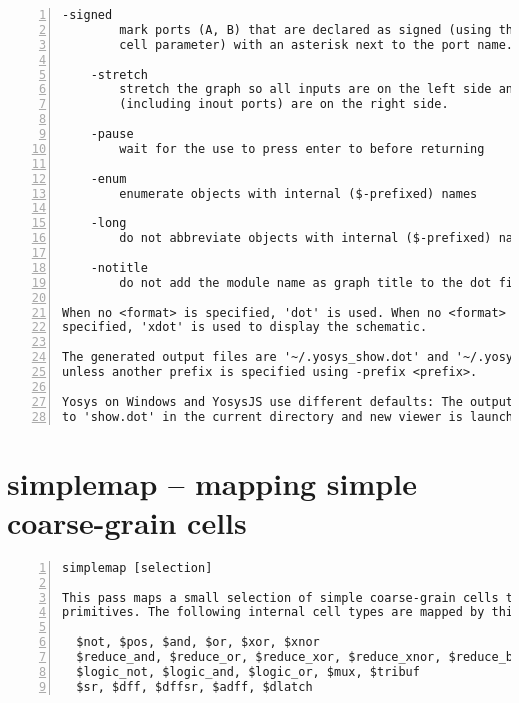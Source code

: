 \begin{lstlisting}[numbers=left,frame=single]
    -signed
        mark ports (A, B) that are declared as signed (using the [AB]_SIGNED
        cell parameter) with an asterisk next to the port name.

    -stretch
        stretch the graph so all inputs are on the left side and all outputs
        (including inout ports) are on the right side.

    -pause
        wait for the use to press enter to before returning

    -enum
        enumerate objects with internal ($-prefixed) names

    -long
        do not abbreviate objects with internal ($-prefixed) names

    -notitle
        do not add the module name as graph title to the dot file

When no <format> is specified, 'dot' is used. When no <format> and <viewer> is
specified, 'xdot' is used to display the schematic.

The generated output files are '~/.yosys_show.dot' and '~/.yosys_show.<format>',
unless another prefix is specified using -prefix <prefix>.

Yosys on Windows and YosysJS use different defaults: The output is written
to 'show.dot' in the current directory and new viewer is launched.
\end{lstlisting}

\section{simplemap -- mapping simple coarse-grain cells}
\label{cmd:simplemap}
\begin{lstlisting}[numbers=left,frame=single]
    simplemap [selection]

This pass maps a small selection of simple coarse-grain cells to yosys gate
primitives. The following internal cell types are mapped by this pass:

  $not, $pos, $and, $or, $xor, $xnor
  $reduce_and, $reduce_or, $reduce_xor, $reduce_xnor, $reduce_bool
  $logic_not, $logic_and, $logic_or, $mux, $tribuf
  $sr, $dff, $dffsr, $adff, $dlatch
\end{lstlisting}

